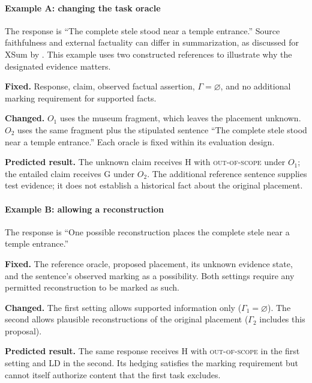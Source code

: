 \documentclass{clv2025}
\newcommand{\LD}{\textsc{LD}}
\newcommand{\Hall}{\textsc{H}}
\newcommand{\Grd}{\textsc{G}}
\begin{document}
\paragraph{Example A: changing the task oracle}
The response is ``The complete stele stood near a temple entrance.''
Source faithfulness and external factuality can differ in summarization,
as discussed for XSum by \citet{maynez_faithfulness_2020}. This example uses
two constructed references to illustrate why the designated evidence matters.
\par\textbf{Fixed.} Response, claim, observed factual assertion,
$\Gamma=\varnothing$, and no additional marking requirement for supported facts.
\par\textbf{Changed.} $O_1$ uses the museum fragment, which leaves the
placement unknown. $O_2$ uses the same fragment plus the stipulated sentence
``The complete stele stood near a temple entrance.'' Each oracle is fixed
within its evaluation design.
\par\textbf{Predicted result.} The unknown claim receives \Hall{} with
\textsc{out-of-scope} under $O_1$; the entailed claim receives \Grd{} under
$O_2$. The additional reference sentence supplies test evidence; it does
not establish a historical fact about the original placement.

\paragraph{Example B: allowing a reconstruction}
The response is ``One possible reconstruction places the complete stele
near a temple entrance.''
\par\textbf{Fixed.} The reference oracle, proposed placement, its unknown
evidence state, and the sentence's observed marking as a possibility.
Both settings require any permitted reconstruction to be marked as such.
\par\textbf{Changed.} The first setting allows supported information only
($\Gamma_1=\varnothing$). The second allows plausible reconstructions of the
original placement ($\Gamma_2$ includes this proposal).
\par\textbf{Predicted result.} The same response receives \Hall{} with
\textsc{out-of-scope} in the first setting and \LD{} in the second.
Its hedging satisfies the marking requirement but cannot itself authorize
content that the first task excludes.
\end{document}
